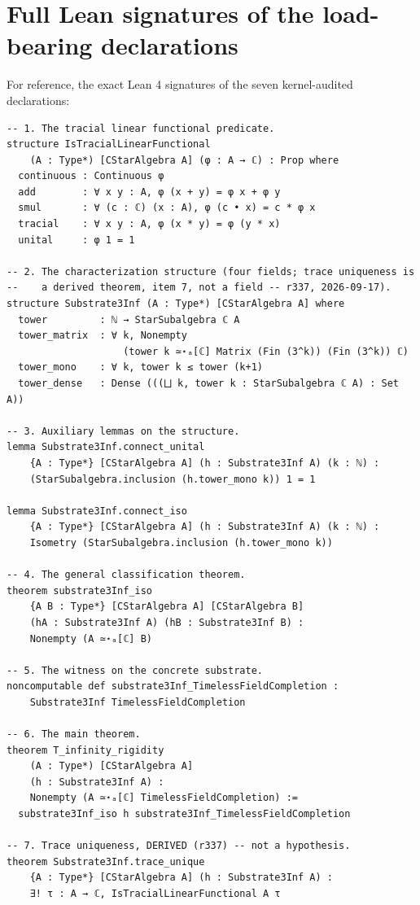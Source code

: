 \documentclass[11pt,a4paper]{article}
\theoremstyle{plain}
\theoremstyle{definition}
\begin{document}
\appendix

\section{Full Lean signatures of the load-bearing declarations}
\label{app:signatures}

For reference, the exact Lean 4 signatures of the seven kernel-audited declarations:

\begin{lstlisting}
-- 1. The tracial linear functional predicate.
structure IsTracialLinearFunctional
    (A : Type*) [CStarAlgebra A] (φ : A → ℂ) : Prop where
  continuous : Continuous φ
  add        : ∀ x y : A, φ (x + y) = φ x + φ y
  smul       : ∀ (c : ℂ) (x : A), φ (c • x) = c * φ x
  tracial    : ∀ x y : A, φ (x * y) = φ (y * x)
  unital     : φ 1 = 1

-- 2. The characterization structure (four fields; trace uniqueness is
--    a derived theorem, item 7, not a field -- r337, 2026-09-17).
structure Substrate3Inf (A : Type*) [CStarAlgebra A] where
  tower         : ℕ → StarSubalgebra ℂ A
  tower_matrix  : ∀ k, Nonempty
                    (tower k ≃⋆ₐ[ℂ] Matrix (Fin (3^k)) (Fin (3^k)) ℂ)
  tower_mono    : ∀ k, tower k ≤ tower (k+1)
  tower_dense   : Dense (((⨆ k, tower k : StarSubalgebra ℂ A) : Set A))

-- 3. Auxiliary lemmas on the structure.
lemma Substrate3Inf.connect_unital
    {A : Type*} [CStarAlgebra A] (h : Substrate3Inf A) (k : ℕ) :
    (StarSubalgebra.inclusion (h.tower_mono k)) 1 = 1

lemma Substrate3Inf.connect_iso
    {A : Type*} [CStarAlgebra A] (h : Substrate3Inf A) (k : ℕ) :
    Isometry (StarSubalgebra.inclusion (h.tower_mono k))

-- 4. The general classification theorem.
theorem substrate3Inf_iso
    {A B : Type*} [CStarAlgebra A] [CStarAlgebra B]
    (hA : Substrate3Inf A) (hB : Substrate3Inf B) :
    Nonempty (A ≃⋆ₐ[ℂ] B)

-- 5. The witness on the concrete substrate.
noncomputable def substrate3Inf_TimelessFieldCompletion :
    Substrate3Inf TimelessFieldCompletion

-- 6. The main theorem.
theorem T_infinity_rigidity
    (A : Type*) [CStarAlgebra A]
    (h : Substrate3Inf A) :
    Nonempty (A ≃⋆ₐ[ℂ] TimelessFieldCompletion) :=
  substrate3Inf_iso h substrate3Inf_TimelessFieldCompletion

-- 7. Trace uniqueness, DERIVED (r337) -- not a hypothesis.
theorem Substrate3Inf.trace_unique
    {A : Type*} [CStarAlgebra A] (h : Substrate3Inf A) :
    ∃! τ : A → ℂ, IsTracialLinearFunctional A τ
\end{lstlisting}
\end{document}
